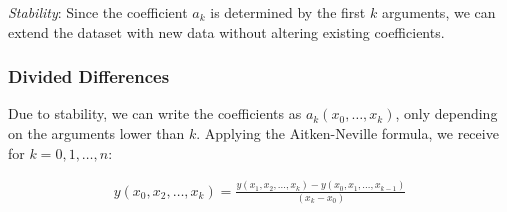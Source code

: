 \emph{Stability}: Since the coefficient $a_k$ is determined by the first $k$ arguments,
we can extend the dataset with new data without altering existing coefficients.

\subsubsection{Divided Differences}

Due to stability, we can write the coefficients as $a_k(x_0,\ldots,x_k)$, only depending on the arguments lower than $k$.
Applying the Aitken-Neville formula, we receive for $k=0,1,\ldots,n$:

\begin{align*}
	y(x_0, x_2, \ldots, x_k)=\frac{y(x_1,x_2,\ldots,x_k) - y(x_0, x_1, \ldots, x_{k-1})}{(x_k - x_0)}
\end{align*}


